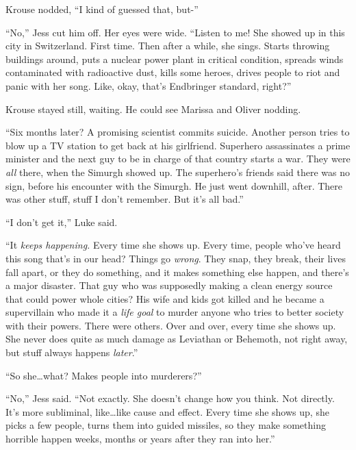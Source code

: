 Krouse nodded, ``I kind of guessed that, but-''



``No,'' Jess cut him off.  Her eyes were wide.  ``Listen to me!  She showed up in this city in Switzerland.  First time.  Then after a while, she sings.  Starts throwing buildings around, puts a nuclear power plant in critical condition, spreads winds contaminated with radioactive dust, kills some heroes, drives people to riot and panic with her song.  Like, okay, that's Endbringer standard, right?''



Krouse stayed still, waiting.  He could see Marissa and Oliver nodding.



``Six months later?  A promising scientist commits suicide.  Another person tries to blow up a TV station to get back at his girlfriend.  Superhero assassinates a prime minister and the next guy to be in charge of that country starts a war.  They were \emph{all} there, when the Simurgh showed up.  The superhero's friends said there was no sign, before his encounter with the Simurgh.  He just went downhill, after.  There was other stuff, stuff I don't remember.  But it's all bad.''



``I don't get it,'' Luke said.



``It \emph{keeps happening.  }Every time she shows up.  Every time, people who've heard this song that's in our head?  Things go \emph{wrong}.  They snap, they break, their lives fall apart, or they do something, and it makes something else happen, and there's a major disaster.  That guy who was supposedly making a clean energy source that could power whole cities?  His wife and kids got killed and he became a supervillain who made it a \emph{life goal} to murder anyone who tries to better society with their powers.  There were others.  Over and over, every time she shows up.  She never does quite as much damage as Leviathan or Behemoth, not right away, but stuff always happens \emph{later}.''



``So she\ldots what?  Makes people into murderers?''



``No,'' Jess said.  ``Not exactly.  She doesn't change how you think.  Not directly.  It's more subliminal, like\ldots like cause and effect.  Every time she shows up, she picks a few people, turns them into guided missiles, so they make something horrible happen weeks, months or years after they ran into her.''



